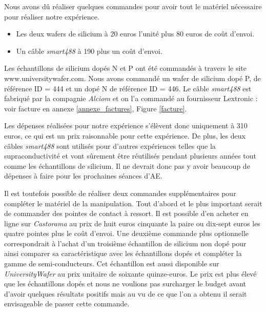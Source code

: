 Nous avons dû réaliser quelques commandes pour avoir tout le matériel nécessaire pour réaliser notre expérience.

\begin{itemize}
  \item Les deux wafers de silicium à 20 euros l'unité plus 80 euros de coût d'envoi.
  \item Un câble \emph{smart488} à 190 plus un coût d'envoi.
\end{itemize}
\bigskip
Les échantillons de silicium dopés N et P ont été commandés à travers le site www.universitywafer.com. Nous avons commandé un wafer de silicium dopé P, de référence ID = 444  et un dopé N de référence ID = 446. Le câble \emph{smart488} est fabriqué par la compagnie \emph{Alciom} et on l'a commandé au fournisseur Lextronic : voir facture en annexe \ref{annexe_factures}, Figure \ref{facture}.

Les dépenses réalisées pour notre expérience s'élèvent donc uniquement à 310 euros, ce qui est un prix raisonnable pour cette expérience. De plus, les deux câbles \emph{smart488} sont utilisés pour d'autres expériences telles que la supraconductivité et vont sûrement être réutilisés pendant plusieurs années tout comme les échantillons de silicium. Il ne devrait donc pas y avoir beaucoup de dépenses à faire pour les prochaines séances d'AE.

Il est toutefois possible de réaliser deux commandes supplémentaires pour compléter le matériel de la manipulation.
Tout d'abord et le plus important serait de commander des pointes de contact à ressort. Il est possible d'en acheter en ligne sur \emph{Castorama} au prix de huit euros cinquante la paire ou dix-sept euros les quatre pointes plus le coût d'envoi.
Une deuxième commande plus optionnelle correspondrait à l'achat d'un troisième échantillon de silicium non dopé pour ainsi comparer sa caractéristique avec les échantillons dopés et compléter la gamme de semi-conducteurs. Cet échantillon est aussi disponible sur \emph{UniversityWafer} au prix unitaire de soixante quinze-euros. Le prix est plus élevé que les échantillons dopés et nous ne voulions pas surcharger le budget avant d'avoir quelques résultats positifs mais au vu de ce que l'on a obtenu il serait envisageable de passer cette commande.
